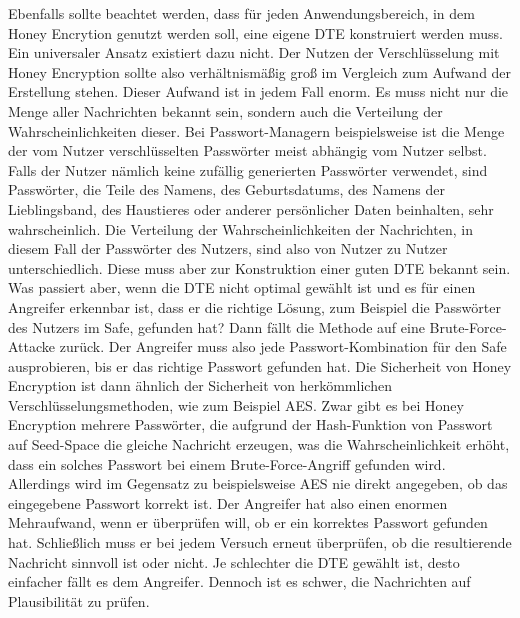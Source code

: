 Ebenfalls sollte beachtet werden, dass für jeden Anwendungsbereich, in dem Honey Encrytion genutzt werden soll, eine eigene DTE konstruiert werden muss. Ein universaler Ansatz existiert dazu nicht. Der Nutzen der Verschlüsselung mit Honey Encryption sollte also verhältnismäßig groß im Vergleich zum Aufwand der Erstellung stehen. Dieser Aufwand ist in jedem Fall enorm. Es muss nicht nur die Menge aller Nachrichten bekannt sein, sondern auch die Verteilung der Wahrscheinlichkeiten dieser. Bei Passwort-Managern beispielsweise ist die Menge der vom Nutzer verschlüsselten Passwörter meist abhängig vom Nutzer selbst. Falls der Nutzer nämlich keine zufällig generierten Passwörter verwendet, sind Passwörter, die Teile des Namens, des Geburtsdatums, des Namens der Lieblingsband, des Haustieres oder anderer persönlicher Daten beinhalten, sehr wahrscheinlich. Die Verteilung der Wahrscheinlichkeiten der Nachrichten, in diesem Fall der Passwörter des Nutzers, sind also von Nutzer zu Nutzer unterschiedlich. Diese muss aber zur Konstruktion einer guten DTE bekannt sein. Was passiert aber, wenn die DTE nicht optimal gewählt ist und es für einen Angreifer erkennbar ist, dass er die richtige Lösung, zum Beispiel die Passwörter des Nutzers im Safe, gefunden hat? Dann fällt die Methode auf eine Brute-Force-Attacke zurück. Der Angreifer muss also jede Passwort-Kombination für den Safe ausprobieren, bis er das richtige Passwort gefunden hat. Die Sicherheit von Honey Encryption ist dann ähnlich der Sicherheit von herkömmlichen Verschlüsselungsmethoden, wie zum Beispiel AES. Zwar gibt es bei Honey Encryption mehrere Passwörter, die aufgrund der Hash-Funktion von Passwort auf Seed-Space die gleiche Nachricht erzeugen, was die Wahrscheinlichkeit erhöht, dass ein solches Passwort bei einem Brute-Force-Angriff gefunden wird. Allerdings wird im Gegensatz zu beispielsweise AES nie direkt angegeben, ob das eingegebene Passwort korrekt ist. Der Angreifer hat also einen enormen Mehraufwand, wenn er überprüfen will, ob er ein korrektes Passwort gefunden hat. Schließlich muss er bei jedem Versuch erneut überprüfen, ob die resultierende Nachricht sinnvoll ist oder nicht. Je schlechter die DTE gewählt ist, desto einfacher fällt es dem Angreifer. Dennoch ist es schwer, die Nachrichten auf Plausibilität zu prüfen.

